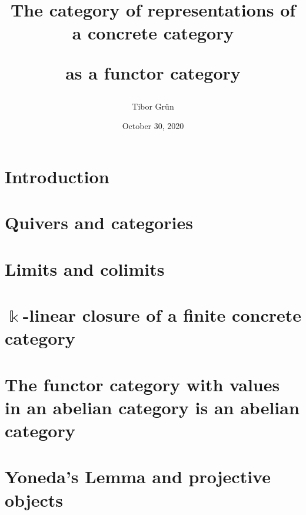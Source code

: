 \documentclass[a4paper,12pt,twoside]{article}
\title{The category of representations of a concrete category\par as a functor category}
\author{Tibor Gr{\"u}n}
\date{October 30, 2020} %
\begin{document}

	

	\newpage
	\newpage

	\tableofcontents\label{toc}
	
	\newpage
	\phantom{}%
	\newpage

	
\section{Introduction}


\section{Quivers and categories}\label{sec:quivers_categories}


\section{Limits and colimits}\label{sec:limits_colimits}


\section{$\Bbbk$-linear closure of a finite concrete category}\label{sec:algebroids}


\section{The functor category with values in an abelian category is an abelian category}\label{sec:functor_cat_abelian}


\section{Yoneda's Lemma and projective objects}\label{sec:yoneda_projective}

\end{document}
